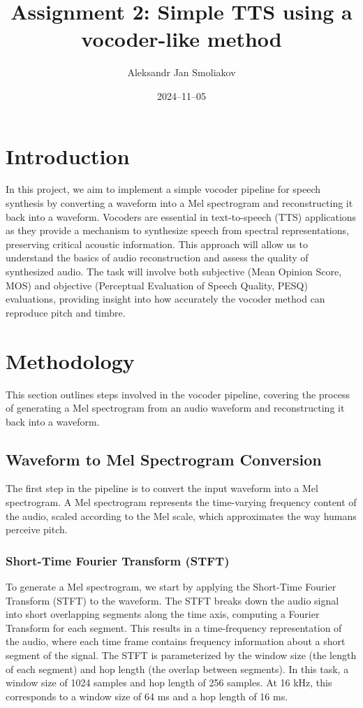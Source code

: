\documentclass{article}
\title{Assignment 2: Simple TTS using a vocoder-like method}
\author{Aleksandr Jan Smoliakov}
\date{2024--11--05}
\begin{document}
\maketitle

\section{Introduction}

In this project, we aim to implement a simple vocoder pipeline for speech synthesis by converting a waveform into a Mel spectrogram and reconstructing it back into a waveform. Vocoders are essential in text-to-speech (TTS) applications as they provide a mechanism to synthesize speech from spectral representations, preserving critical acoustic information. This approach will allow us to understand the basics of audio reconstruction and assess the quality of synthesized audio. The task will involve both subjective (Mean Opinion Score, MOS) and objective (Perceptual Evaluation of Speech Quality, PESQ) evaluations, providing insight into how accurately the vocoder method can reproduce pitch and timbre.

\section{Methodology}

This section outlines steps involved in the vocoder pipeline, covering the process of generating a Mel spectrogram from an audio waveform and reconstructing it back into a waveform.

\subsection{Waveform to Mel Spectrogram Conversion}

The first step in the pipeline is to convert the input waveform into a Mel spectrogram. A Mel spectrogram represents the time-varying frequency content of the audio, scaled according to the Mel scale, which approximates the way humans perceive pitch.

\subsubsection{Short-Time Fourier Transform (STFT)}

To generate a Mel spectrogram, we start by applying the Short-Time Fourier Transform (STFT) to the waveform. The STFT breaks down the audio signal into short overlapping segments along the time axis, computing a Fourier Transform for each segment. This results in a time-frequency representation of the audio, where each time frame contains frequency information about a short segment of the signal. The STFT is parameterized by the window size (the length of each segment) and hop length (the overlap between segments). In this task, a window size of 1024 samples and hop length of 256 samples. At 16 kHz, this corresponds to a window size of 64 ms and a hop length of 16 ms.
\end{document}

